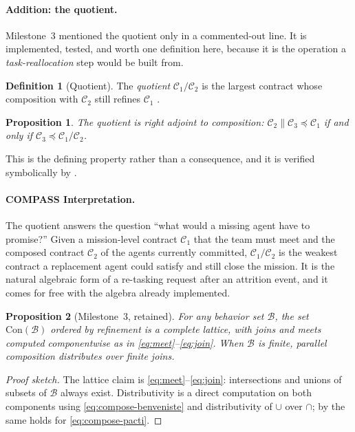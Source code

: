 \documentclass[11pt]{article}
\renewcommand{\preceq}{\preccurlyeq}
\newcommand{\contract}[1]{\mathrm{Con}(#1)}
\newtheorem{proposition}{Proposition}
\theoremstyle{definition}
\newtheorem{definition}{Definition}
\theoremstyle{remark}
\begin{document}
\paragraph{Addition: the quotient.}
Milestone~3 mentioned the quotient only in a commented-out line.
It is implemented, tested, and worth one definition here, because it is the operation a
\emph{task-reallocation} step would be built from.

\begin{definition}[Quotient]
The \emph{quotient} $\mathcal{C}_1 / \mathcal{C}_2$ is the largest contract whose composition
with $\mathcal{C}_2$ still refines $\mathcal{C}_1$
\citep{incerPactiAssumeGuaranteeContracts2025}.
\end{definition}

\begin{proposition}
\label{prop:quotient-adjoint}
The quotient is right adjoint to composition:
$\mathcal{C}_2 \parallel \mathcal{C}_3 \preceq \mathcal{C}_1$ if and only if
$\mathcal{C}_3 \preceq \mathcal{C}_1 / \mathcal{C}_2$.
\end{proposition}

This is the defining property rather than a consequence, and it is verified symbolically by
.

\paragraph{COMPASS Interpretation.}
The quotient answers the question ``what would a missing agent have to promise?''
Given a mission-level contract $\mathcal{C}_1$ that the team must meet and the composed
contract $\mathcal{C}_2$ of the agents currently committed, $\mathcal{C}_1 / \mathcal{C}_2$ is
the weakest contract a replacement agent could satisfy and still close the mission.
It is the natural algebraic form of a re-tasking request after an attrition event, and it comes
for free with the algebra already implemented.

\begin{proposition}[Milestone~3, retained]
\label{prop:con-lattice}
For any behavior set $\mathcal{B}$, the set $\contract{\mathcal{B}}$ ordered by refinement is a
complete lattice, with joins and meets computed componentwise as in
\eqref{eq:meet}--\eqref{eq:join}.
When $\mathcal{B}$ is finite, parallel composition distributes over finite joins.
\end{proposition}

\begin{proof}[Proof sketch]
The lattice claim is \eqref{eq:meet}--\eqref{eq:join}: intersections and unions of subsets of
$\mathcal{B}$ always exist.
Distributivity is a direct computation on both components using
\eqref{eq:compose-benveniste} and distributivity of $\cup$ over $\cap$; by
 the same holds for \eqref{eq:compose-pacti}.
\end{proof}
\end{document}
